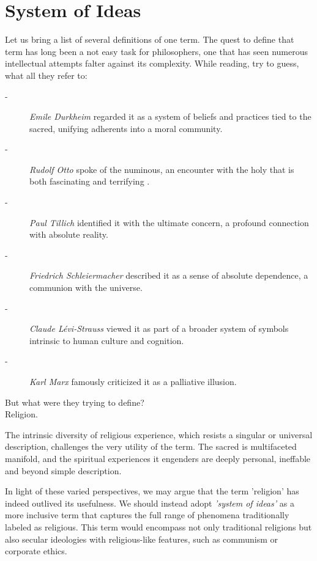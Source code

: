 \documentclass[11pt,a4]{article}
\begin{document}
\section{System of Ideas}
Let us bring a list of several definitions of one term. The quest to define that term has long been a not easy task for philosophers, one that has seen numerous intellectual attempts falter against its complexity.
While reading, try to guess, what all they refer to:

\begin{description}
    \item[-] \textit{Emile Durkheim} regarded it as a system of beliefs and practices tied to the sacred, unifying adherents into a moral community.
    \item[-] \textit{Rudolf Otto} spoke of the numinous, an encounter with the holy that is both fascinating and terrifying \cite{Otto1996-in}.
    \item[-] \textit{Paul Tillich} identified it with the ultimate concern, a profound connection with absolute reality.
    \item[-] \textit{Friedrich Schleiermacher} described it as a sense of absolute dependence, a communion with the universe.
    \item[-] \textit{Claude Lévi-Strauss} viewed it as part of a broader system of symbols intrinsic to human culture and cognition.
    \item[-] \textit{Karl Marx} famously criticized it as a palliative illusion.
\end{description}

But what were they trying to define?\\
Religion.

 \par
The intrinsic diversity of religious experience, which resists a singular or universal description, challenges the very utility of the term. The sacred is multifaceted manifold, and the spiritual experiences it engenders are deeply personal, ineffable and beyond simple description.

\par
In light of these varied perspectives, we may argue that the term 'religion' has indeed outlived its usefulness. We should instead adopt \textit{'system of ideas'} as a more inclusive term that captures the full range of phenomena traditionally labeled as religious. This term would encompass not only traditional religions but also secular ideologies with religious-like features, such as communism or corporate ethics.
\end{document}
